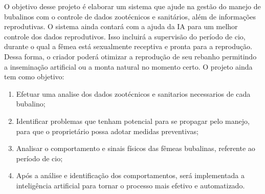 O objetivo desse projeto é elaborar um sistema que ajude na gestão do manejo de bubalinos com o controle de dados zootécnicos e sanitários, além de informações reprodutivas. O sistema ainda contará com a ajuda da IA para um melhor controle dos dados reprodutivos. Isso incluirá a supervisão do período de cio, durante o qual a fêmea está sexualmente receptiva e pronta para a reprodução. Dessa forma, o criador poderá otimizar a reprodução de seu rebanho permitindo a inseminação artificial ou a monta natural no momento certo.
 O projeto ainda tem como objetivo: 

\begin{enumerate}
    \item Efetuar uma analise dos dados zootécnicos e sanitarios necessarios de cada bubalino;
    \item Identificar problemas que tenham potencial para se propagar pelo manejo, para que o proprietário possa adotar medidas preventivas;
    \item Analisar o comportamento e sinais físicos das fêmeas bubalinas, referente ao período de cio;
    \item Após a análise e identificação dos comportamentos, será implementada a inteligência artificial para tornar o processo mais efetivo e automatizado.
\end{enumerate}

